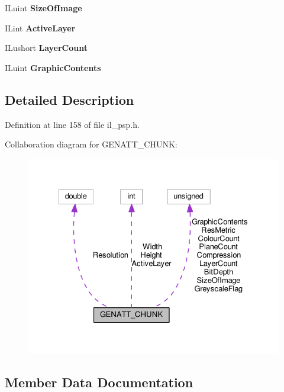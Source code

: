 \begin{DoxyCompactItemize}
\mbox{\label{structGENATT__CHUNK_a6b0263b9667615c27ca04de3e0ce36e7}} 
I\+Luint {\bfseries Size\+Of\+Image}
\item 
\mbox{\label{structGENATT__CHUNK_a72cc2356232a780cce32023cf899c537}} 
I\+Lint {\bfseries Active\+Layer}
\item 
\mbox{\label{structGENATT__CHUNK_a3aee75bcc6da28ffe2d5e5770691082f}} 
I\+Lushort {\bfseries Layer\+Count}
\item 
\mbox{\label{structGENATT__CHUNK_af2858000117eb50d502667331f65639f}} 
I\+Luint {\bfseries Graphic\+Contents}
\end{DoxyCompactItemize}


\subsection{Detailed Description}


Definition at line 158 of file il\+\_\+psp.\+h.



Collaboration diagram for G\+E\+N\+A\+T\+T\+\_\+\+C\+H\+U\+NK\+:
\nopagebreak
\begin{figure}[H]
\begin{center}
\leavevmode
\includegraphics[width=329pt]{d9/d5a/structGENATT__CHUNK__coll__graph}
\end{center}
\end{figure}


\subsection{Member Data Documentation}
\mbox{\label{structGENATT__CHUNK_a72cc2356232a780cce32023cf899c537}} 
